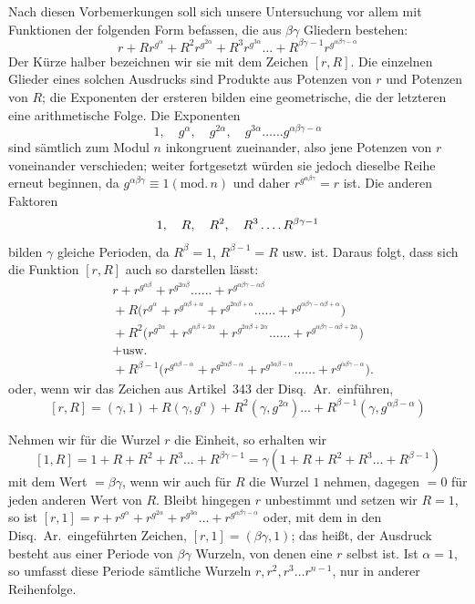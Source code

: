 Nach diesen Vorbemerkungen soll sich unsere Untersuchung vor allem mit Funktionen der folgenden Form befassen, die aus $\beta\gamma$ Gliedern bestehen:
\[
r+Rr^{g^\alpha}+R^2r^{g^{2\alpha}}+R^3r^{g^{3\alpha}}\ldots+R^{\beta\gamma-1}r^{g^{\alpha\beta\gamma-\alpha}}
\]
Der Kürze halber bezeichnen wir sie mit dem Zeichen $[r,R]$. Die einzelnen Glieder eines solchen Ausdrucks sind Produkte aus Potenzen von $r$ und Potenzen von $R$; die Exponenten der ersteren bilden eine geometrische, die der letzteren eine arithmetische Folge. Die Exponenten
\[
1,\quad g^\alpha,\quad g^{2\alpha},\quad g^{3\alpha}\ldots\ldots g^{\alpha\beta\gamma-\alpha}
\]
sind sämtlich zum Modul $n$ inkongruent zueinander, also jene Potenzen von $r$ voneinander verschieden; weiter fortgesetzt würden sie jedoch dieselbe Reihe erneut beginnen, da $g^{\alpha\beta\gamma}\equiv1(\mathrm{mod.}\,n)$ und daher $r^{g^{\alpha\beta\gamma}}=r$ ist. Die anderen Faktoren
\[
1,\quad R,\quad R^2,\quad R^3\mathinner{.\,.\,.\,.} R^{\beta\gamma-1}
\]
bilden $\gamma$ gleiche Perioden, da $R^\beta=1$, $R^{\beta-1}=R$ usw. ist. Daraus folgt, dass sich die Funktion $[r,R]$ auch so darstellen lässt:
\[
\begin{aligned}
&r+r^{g^{\alpha\beta}}+r^{g^{2\alpha\beta}}\ldots\ldots+r^{g^{\alpha\beta\gamma-\alpha\beta}}\\
&{}+R\bigl(r^{g^\alpha}+r^{g^{\alpha\beta+\alpha}}+r^{g^{2\alpha\beta+\alpha}}\ldots\ldots+r^{g^{\alpha\beta\gamma-\alpha\beta+\alpha}}\bigr)\\
&{}+R^2\bigl(r^{g^{2\alpha}}+r^{g^{\alpha\beta+2\alpha}}+r^{g^{2\alpha\beta+2\alpha}}\ldots\ldots+r^{g^{\alpha\beta\gamma-\alpha\beta+2\alpha}}\bigr)\\
&{}+\text{usw.}\\
&{}+R^{\beta-1}\bigl(r^{g^{\alpha\beta-\alpha}}+r^{g^{2\alpha\beta-\alpha}}+r^{g^{3\alpha\beta-\alpha}}\ldots\ldots+r^{g^{\alpha\beta\gamma-\alpha}}\bigr).
\end{aligned}
\]
oder, wenn wir das Zeichen aus Artikel~343 der Disq.\ Ar.\ einführen,
\[
[r,R]=(\gamma,1)+R(\gamma,g^\alpha)+R^2(\gamma,g^{2\alpha})\ldots+R^{\beta-1}(\gamma,g^{\alpha\beta-\alpha})
\]

Nehmen wir für die Wurzel $r$ die Einheit, so erhalten wir
\[
[1,R]=1+R+R^2+R^3\ldots+R^{\beta\gamma-1}=\gamma(1+R+R^2+R^3\ldots+R^{\beta-1})
\]
mit dem Wert $=\beta\gamma$, wenn wir auch für $R$ die Wurzel $1$ nehmen, dagegen $=0$ für jeden anderen Wert von $R$. Bleibt hingegen $r$ unbestimmt und setzen wir $R=1$, so ist $[r,1]=r+r^{g^\alpha}+r^{g^{2\alpha}}+r^{g^{3\alpha}}\ldots+r^{g^{\alpha\beta\gamma-\alpha}}$ oder, mit dem in den Disq.\ Ar.\ eingeführten Zeichen, $[r,1]=(\beta\gamma,1)$; das heißt, der Ausdruck besteht aus einer Periode von $\beta\gamma$ Wurzeln, von denen eine $r$ selbst ist. Ist $\alpha=1$, so umfasst diese Periode sämtliche Wurzeln $r,r^2,r^3\ldots r^{n-1}$, nur in anderer Reihenfolge.

